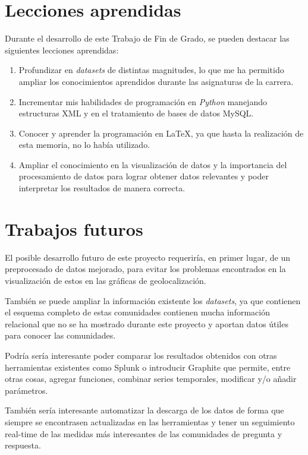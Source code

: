 \documentclass[a4paper, 12pt]{book}
\begin{document}
\section{Lecciones aprendidas}
\label{sec:lecciones_aprendidas}

Durante el desarrollo de este Trabajo de Fin de Grado, se pueden destacar las siguientes lecciones aprendidas:

\begin{enumerate}
  \item Profundizar en \textit{datasets} de distintas magnitudes, lo que me ha permitido ampliar los conocimientos aprendidos durante las asignaturas de la carrera.
  \item Incrementar mis habilidades de programación en \emph{Python} manejando estructuras XML y en el tratamiento de bases de datos MySQL.
  \item Conocer y aprender la programación en \LaTeX, ya que hasta la realización de esta memoria, no lo había utilizado.
  \item Ampliar el conocimiento en la visualización de datos y la importancia del procesamiento de datos para lograr obtener datos relevantes y poder interpretar los resultados de manera correcta. 
\end{enumerate}


\section{Trabajos futuros}
\label{sec:trabajos_futuros}
El posible desarrollo futuro de este proyecto requeriría, en primer lugar, de un preprocesado de datos mejorado, para evitar los problemas encontrados en la visualización de estos en las gráficas de geolocalización. 

También se puede ampliar la información existente los \textit{datasets}, ya que contienen el esquema completo de estas comunidades contienen mucha información relacional que no se ha mostrado durante este proyecto y aportan datos útiles para conocer las comunidades.

Podría sería interesante poder comparar los resultados obtenidos con otras herramientas existentes como Splunk o introducir Graphite que permite, entre otras cosas, agregar funciones, combinar series temporales, modificar y/o añadir parámetros.

También sería interesante automatizar la descarga de los datos de forma que siempre se encontrasen actualizadas en las herramientas y tener un seguimiento real-time de las medidas más interesantes de las comunidades de pregunta y respuesta.
\cleardoublepage
\glsaddall
\printglossary[type=\acronymtype]
\printglossary
\end{document}
